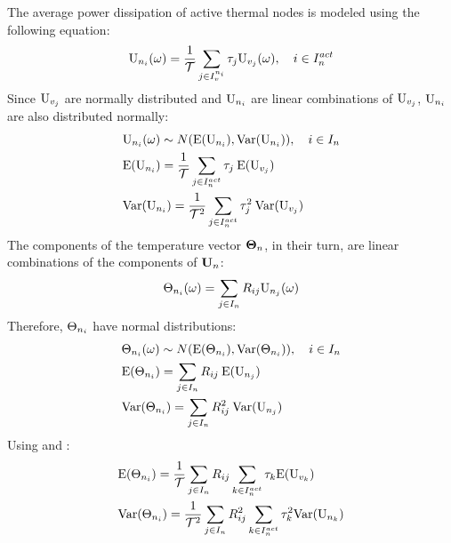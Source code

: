 The average power dissipation of active thermal nodes is modeled using the following equation:
\[
  \mbox{U}_{n_i}(\omega) = \frac{1}{\mathcal{T}} \sum_{j \in I_v^{n_i}} \tau_j \mbox{U}_{v_j}(\omega), \hspace{10pt} i \in I^{act}_n
\]
Since $\mbox{U}_{v_j}$ are normally distributed and $\mbox{U}_{n_i}$ are linear combinations of $\mbox{U}_{v_j}$, $\mbox{U}_{n_i}$ are also distributed normally:
\begin{align}
  & \spower_{\node_i}(\outcome) \sim \normal(\mean{\spower_{\node_i}}, \variance{\spower_{\node_i}}), \sep i \in \nodeindex \nonumber \\
  & \mean{\spower_{\node_i}} = \frac{1}{\period} \sum_{j \in \nodeindexactive} \executiontime_j \: \mean{\spower_{\task_j}} \equlabel{power-mean} \\
  & \variance{\spower_{\node_i}} = \frac{1}{\period^2} \sum_{j \in \nodeindexactive} \executiontime_j^2 \: \variance{\spower_{\task_j}} \equlabel{power-variance}
\end{align}
The components of the temperature vector $\mathbf{\Theta}_{n}$, in their turn, are linear combinations of the components of $\mathbf{U}_{n}$:
\[
  \Theta_{n_i}(\omega) = \sum_{j \in I_n} R_{ij} \mbox{U}_{n_j}(\omega)
\]
Therefore, $\Theta_{n_i}$ have normal distributions:
\begin{align*}
  & \Theta_{n_i}(\omega) \sim N(\text{E}(\Theta_{n_i}), \text{Var}(\Theta_{n_i})), \hspace{10pt} i \in I_n \\
  & \text{E}(\Theta_{n_i}) = \sum_{j \in I_n} R_{ij} \: \text{E}(\mbox{U}_{n_j}) \\
  & \text{Var}(\Theta_{n_i}) = \sum_{j \in I_n} R^2_{ij} \: \text{Var}(\mbox{U}_{n_j})
\end{align*}
Using  and :
\begin{align*}
  & \text{E}(\Theta_{n_i}) = \frac{1}{\mathcal{T}} \sum_{j \in I_n} R_{ij} \sum_{k \in I^{act}_n} \tau_k \text{E}(\mbox{U}_{v_k}) \\
  & \text{Var}(\Theta_{n_i}) = \frac{1}{\mathcal{T}^2} \sum_{j \in I_n} R^2_{ij} \sum_{k \in I^{act}_n} \tau^2_k \text{Var}(\mbox{U}_{n_k})
\end{align*}
